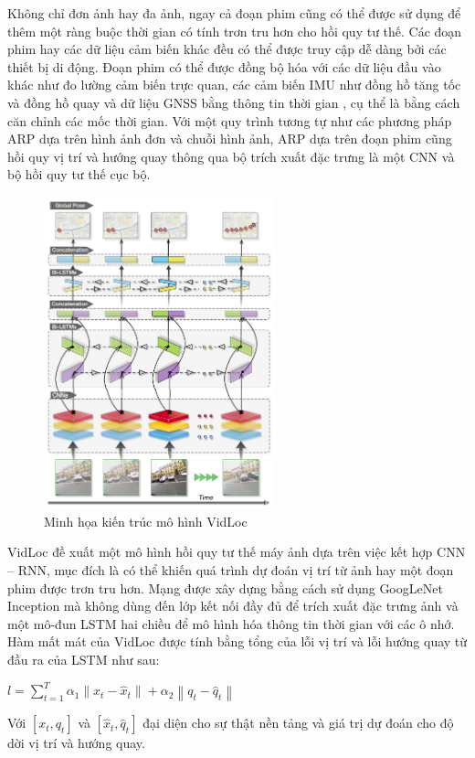 Không chỉ đơn ảnh hay đa ảnh, ngay cả đoạn phim cũng có thể được sử dụng để thêm một ràng buộc thời gian có tính trơn tru hơn cho hồi quy tư thế. Các đoạn phim hay các dữ liệu cảm biến khác đều có thể được truy cập dễ dàng bởi các thiết bị di động. Đoạn phim có thể được đồng bộ hóa với các dữ liệu đầu vào khác như đo lường cảm biến trực quan, các cảm biến IMU như đồng hồ tăng tốc và đồng hồ quay và dữ liệu GNSS bằng thông tin thời gian , cụ thể là bằng cách căn chỉnh các mốc thời gian. Với một quy trình tương tự như các phương pháp ARP dựa trên hình ảnh đơn và chuỗi hình ảnh, ARP dựa trên đoạn phim cũng hồi quy vị trí và hướng quay thông qua bộ trích xuất đặc trưng là một CNN và bộ hồi quy tư thế cục bộ.
\begin{figure}[t]
    \centering
    \includegraphics[width=0.6\textwidth]{pics/Chapter2/vidloc.png}
    \caption{Minh họa kiến trúc mô hình VidLoc \cite{clark2017vidloc}}
\end{figure}
VidLoc \cite{clark2017vidloc} đề xuất một mô hình hồi quy tư thế máy ảnh dựa trên việc kết hợp CNN – RNN, mục đích là có thể khiến quá trình dự đoán vị trí từ ảnh hay một đoạn phim được trơn tru hơn. Mạng được xây dựng bằng cách sử dụng GoogLeNet Inception \cite{szegedy2014going} mà không dùng đến lớp kết nối đầy đủ để trích xuất đặc trưng ảnh và một mô-đun LSTM hai chiều để mô hình hóa thông tin thời gian với các ô nhớ.  Hàm mất mát của VidLoc được tính bằng tổng của lỗi vị trí và lỗi hướng quay từ đầu ra của LSTM như sau:
\begin{center}
    $ l = \sum_{t=1}^T \alpha_1 \left \| x_t - \hat{x}_t \right \| + \alpha_2 \left \| q_t - \hat{q}_t \right \| $
\end{center}
Với $[x_t, q_t]$ và $[\hat{x}_t, \hat{q}_t]$ đại diện cho sự thật nền tảng và giá trị dự đoán cho độ dời vị trí và hướng quay.

